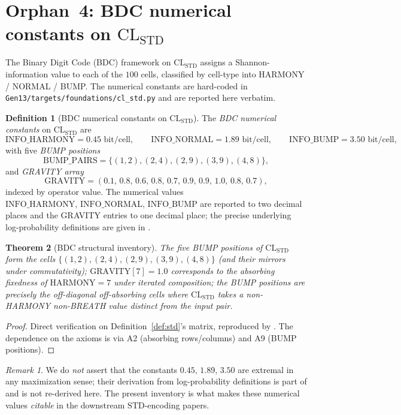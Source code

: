 \documentclass[11pt,reqno]{amsart}
\theoremstyle{plain}
\newtheorem{theorem}{Theorem}[section]
\theoremstyle{definition}
\newtheorem{definition}[theorem]{Definition}
\theoremstyle{remark}
\newtheorem*{remark}{Remark}
\newcommand{\STD}{\mathrm{STD}}
\begin{document}
\section{Orphan~4: BDC numerical constants on $\mathrm{CL}_\STD$}
\label{sec:bdc}

The Binary Digit Code (BDC) framework on $\mathrm{CL}_\STD$ assigns a
Shannon-information value to each of the $100$ cells, classified by
cell-type into HARMONY / NORMAL / BUMP. The numerical constants are
hard-coded in \texttt{Gen13/targets/foundations/cl\_std.py}
\cite{FoundationsModule} and are reported here verbatim.

\begin{definition}[BDC numerical constants on $\mathrm{CL}_\STD$]
\label{def:bdc}
The \emph{BDC numerical constants} on $\mathrm{CL}_\STD$ are
\[
\mathrm{INFO\_HARMONY} = 0.45 \text{ bit/cell},\qquad
\mathrm{INFO\_NORMAL} = 1.89 \text{ bit/cell},\qquad
\mathrm{INFO\_BUMP} = 3.50 \text{ bit/cell},
\]
with five \emph{BUMP positions}
\[
\mathrm{BUMP\_PAIRS} = \{(1,2),(2,4),(2,9),(3,9),(4,8)\},
\]
and \emph{GRAVITY array}
\[
\mathrm{GRAVITY} = (0.1,\,0.8,\,0.6,\,0.8,\,0.7,\,0.9,\,0.9,\,1.0,\,0.8,\,0.7),
\]
indexed by operator value. The numerical values
$\mathrm{INFO\_HARMONY,\,INFO\_NORMAL,\,INFO\_BUMP}$ are reported to
two decimal places and the GRAVITY entries to one decimal place;
the precise underlying log-probability definitions are given in
\cite[\S A9]{SandersForcing}.
\end{definition}

\begin{theorem}[BDC structural inventory]\label{thm:bdc}
The five BUMP positions of $\mathrm{CL}_\STD$ form the cells
$\{(1,2),(2,4),(2,9),(3,9),(4,8)\}$ (and their mirrors under
commutativity); $\mathrm{GRAVITY}[7]=1.0$ corresponds to the absorbing
fixedness of $\mathrm{HARMONY}=7$ under iterated composition; the
BUMP positions are precisely the off-diagonal off-absorbing cells
where $\mathrm{CL}_\STD$ takes a non-HARMONY non-BREATH value
distinct from the input pair.
\end{theorem}

\begin{proof}
Direct verification on Definition~\ref{def:std}'s matrix, reproduced
by \cite{FoundationsModule}. The dependence on the axioms is via A2
(absorbing rows/columns) and A9 (BUMP positions).
\end{proof}

\begin{remark}
We do \emph{not} assert that the constants $0.45,\,1.89,\,3.50$ are
extremal in any maximization sense; their derivation from
log-probability definitions is part of \cite[\S A9]{SandersForcing}
and is not re-derived here. The present inventory is what makes
these numerical values \emph{citable} in the downstream $\STD$-encoding
papers.
\end{remark}
\end{document}
